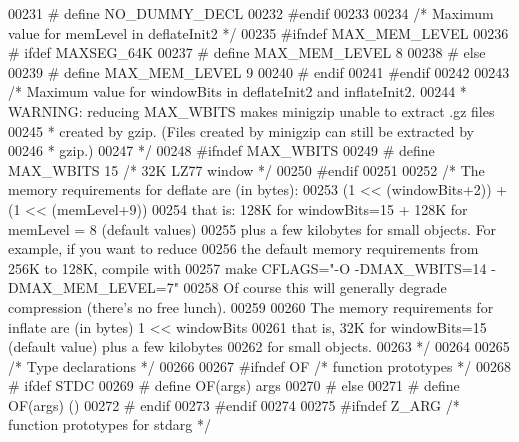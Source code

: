 \begin{DoxyCode}
00231 \textcolor{preprocessor}{#  define NO\_DUMMY\_DECL}
00232 \textcolor{preprocessor}{#endif}
00233 
00234 \textcolor{comment}{/* Maximum value for memLevel in deflateInit2 */}
00235 \textcolor{preprocessor}{#ifndef MAX\_MEM\_LEVEL}
00236 \textcolor{preprocessor}{#  ifdef MAXSEG\_64K}
00237 \textcolor{preprocessor}{#    define MAX\_MEM\_LEVEL 8}
00238 \textcolor{preprocessor}{#  else}
00239 \textcolor{preprocessor}{#    define MAX\_MEM\_LEVEL 9}
00240 \textcolor{preprocessor}{#  endif}
00241 \textcolor{preprocessor}{#endif}
00242 
00243 \textcolor{comment}{/* Maximum value for windowBits in deflateInit2 and inflateInit2.}
00244 \textcolor{comment}{ * WARNING: reducing MAX\_WBITS makes minigzip unable to extract .gz files}
00245 \textcolor{comment}{ * created by gzip. (Files created by minigzip can still be extracted by}
00246 \textcolor{comment}{ * gzip.)}
00247 \textcolor{comment}{ */}
00248 \textcolor{preprocessor}{#ifndef MAX\_WBITS}
00249 \textcolor{preprocessor}{#  define MAX\_WBITS   15 }\textcolor{comment}{/* 32K LZ77 window */}\textcolor{preprocessor}{}
00250 \textcolor{preprocessor}{#endif}
00251 
00252 \textcolor{comment}{/* The memory requirements for deflate are (in bytes):}
00253 \textcolor{comment}{            (1 << (windowBits+2)) +  (1 << (memLevel+9))}
00254 \textcolor{comment}{ that is: 128K for windowBits=15  +  128K for memLevel = 8  (default values)}
00255 \textcolor{comment}{ plus a few kilobytes for small objects. For example, if you want to reduce}
00256 \textcolor{comment}{ the default memory requirements from 256K to 128K, compile with}
00257 \textcolor{comment}{     make CFLAGS="-O -DMAX\_WBITS=14 -DMAX\_MEM\_LEVEL=7"}
00258 \textcolor{comment}{ Of course this will generally degrade compression (there's no free lunch).}
00259 \textcolor{comment}{}
00260 \textcolor{comment}{   The memory requirements for inflate are (in bytes) 1 << windowBits}
00261 \textcolor{comment}{ that is, 32K for windowBits=15 (default value) plus a few kilobytes}
00262 \textcolor{comment}{ for small objects.}
00263 \textcolor{comment}{*/}
00264 
00265                         \textcolor{comment}{/* Type declarations */}
00266 
00267 \textcolor{preprocessor}{#ifndef OF }\textcolor{comment}{/* function prototypes */}\textcolor{preprocessor}{}
00268 \textcolor{preprocessor}{#  ifdef STDC}
00269 \textcolor{preprocessor}{#    define OF(args)  args}
00270 \textcolor{preprocessor}{#  else}
00271 \textcolor{preprocessor}{#    define OF(args)  ()}
00272 \textcolor{preprocessor}{#  endif}
00273 \textcolor{preprocessor}{#endif}
00274 
00275 \textcolor{preprocessor}{#ifndef Z\_ARG }\textcolor{comment}{/* function prototypes for stdarg */}\textcolor{preprocessor}{}

\end{DoxyCode}
